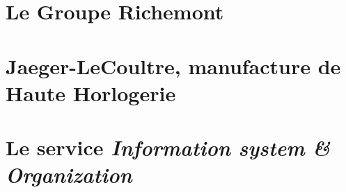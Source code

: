 \section{Le Groupe Richemont}

\section{Jaeger-LeCoultre, manufacture de Haute Horlogerie}

\section{Le service \textit{Information system \& Organization}}

